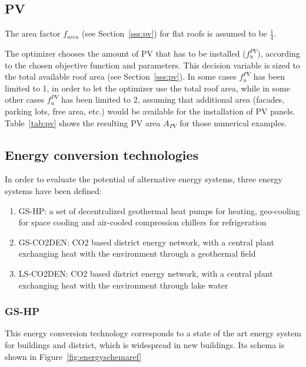 \documentclass{article}
\begin{document}

\subsection{PV}\label{ss:pv}
The area factor $f_{area}$ (see Section~\ref{sss:pv}) for flat roofs is assumed to be $\frac{1}{4}$.

The optimizer chooses the amount of PV that has to be installed ($f_{u}^{PV}$), according to the chosen objective function and parameters. This decision variable is sized to the total available roof area (see Section~\ref{sss:pv}). In some cases $f_{u}^{PV}$ has been limited to 1, in order to let the optimizer use the total roof area, while in some other cases $f_{u}^{PV}$ has been limited to 2, assuming that additional area (facades, parking lots, free area, etc.) would be available for the installation of PV panels. 
Table~\ref{tab:pv} shows the resulting PV area $A_{PV}$ for those numerical examples.



\subsection{Energy conversion technologies}
In order to evaluate the potential of alternative energy systems, three energy systems have been defined:
\begin{enumerate}
	\item GS-HP: a set of decentralized geothermal heat pumps for heating, geo-cooling for space cooling and air-cooled compression chillers for refrigeration
	\item GS-CO2DEN: CO2 based district energy network, with a central plant exchanging heat with the environment through a geothermal field
	\item LS-CO2DEN: CO2 based district energy network, with a central plant exchanging heat with the environment through lake water
\end{enumerate}

\subsubsection{GS-HP}
This energy conversion technology corresponds to a state of the art energy system for buildings and district, which is widespread in new buildings. Its schema is shown in Figure~\ref{fig:energyschemaref}
\end{document}
